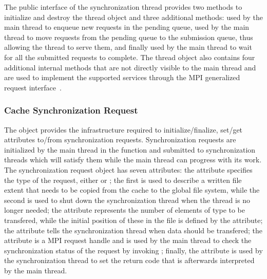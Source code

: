 The public interface of the synchronization thread provides two methods to initialize and destroy the thread object and three additional methods:  used by 
the main thread to enqueue new requests in the pending queue,  used by the main thread to move requests from the pending queue to the submission queue, thus
allowing the thread to serve them, and finally  used by the main thread to wait for all the submitted requests to complete. The thread object also contains
four additional internal methods that are not directly visible to the main thread and are used to implement the supported services through the MPI generalized request interface~\cite{mpispecs}.

\subsubsection{Cache Synchronization Request}
The  object provides the infrastructure required to initialize/finalize, set/get attributes to/from synchronization requests. Synchronization requests are initialized 
by the main thread in the  function and submitted to synchronization threads which will satisfy them while the main thread can progress with its work. 
The synchronization request object has seven attributes: the  attribute specifies the type of the request, either  or ;
the first is used to describe a written file extent that needs to be copied from the cache to the global file system, while the second is used to shut down the synchronization thread when the thread 
is no longer needed; the  attribute represents the number of elements of type  to be transfered, while the initial position of these in the file is defined
by the  attribute; the  attribute tells the synchronization thread when data should be transfered; the  attribute is a MPI request handle and is 
used by the main thread to check the synchronization status of the request by invoking ; finally, the  attribute is used by the synchronization thread to 
set the return code that is afterwards interpreted by the main thread.

